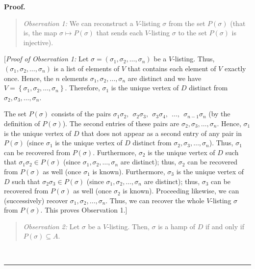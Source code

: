 \documentclass[numbers=enddot,12pt,final,onecolumn,notitlepage]{scrartcl}%
\numberwithin{exer}{subsection}
\theoremstyle{definition}
\newenvironment{statement}{\begin{quote}}{\end{quote}}
\newenvironment{proof}[1][Proof]{\noindent\textbf{#1.} }{\ \rule{0.5em}{0.5em}}
\begin{document}
\begin{proof}
\begin{statement}
\textit{Observation 1:} We can reconstruct a $V$-listing $\sigma$ from the set
$P\left(  \sigma\right)  $ (that is, the map $\sigma\mapsto P\left(
\sigma\right)  $ that sends each $V$-listing $\sigma$ to the set $P\left(
\sigma\right)  $ is injective).
\end{statement}

[\textit{Proof of Observation 1:} Let $\sigma=\left(  \sigma_{1},\sigma
_{2},\ldots,\sigma_{n}\right)  $ be a $V$-listing. Thus, $\left(  \sigma
_{1},\sigma_{2},\ldots,\sigma_{n}\right)  $ is a list of elements of $V$ that
contains each element of $V$ exactly once. Hence, the $n$ elements $\sigma
_{1},\sigma_{2},\ldots,\sigma_{n}$ are distinct and we have $V=\left\{
\sigma_{1},\sigma_{2},\ldots,\sigma_{n}\right\}  $. Therefore, $\sigma_{1}$ is
the unique vertex of $D$ distinct from $\sigma_{2},\sigma_{3},\ldots
,\sigma_{n}$.

The set $P\left(  \sigma\right)  $ consists of the pairs $\sigma_{1}\sigma
_{2},\ \ \sigma_{2}\sigma_{3},\ \ \sigma_{3}\sigma_{4},\ \ \ldots
,\ \ \sigma_{n-1}\sigma_{n}$ (by the definition of $P\left(  \sigma\right)
$). The second entries of these pairs are $\sigma_{2},\sigma_{3},\ldots
,\sigma_{n}$. Hence, $\sigma_{1}$ is the unique vertex of $D$ that does not
appear as a second entry of any pair in $P\left(  \sigma\right)  $ (since
$\sigma_{1}$ is the unique vertex of $D$ distinct from $\sigma_{2},\sigma
_{3},\ldots,\sigma_{n}$). Thus, $\sigma_{1}$ can be recovered from $P\left(
\sigma\right)  $. Furthermore, $\sigma_{2}$ is the unique vertex of $D$ such
that $\sigma_{1}\sigma_{2}\in P\left(  \sigma\right)  $ (since $\sigma
_{1},\sigma_{2},\ldots,\sigma_{n}$ are distinct); thus, $\sigma_{2}$ can be
recovered from $P\left(  \sigma\right)  $ as well (once $\sigma_{1}$ is
known). Furthermore, $\sigma_{3}$ is the unique vertex of $D$ such that
$\sigma_{2}\sigma_{3}\in P\left(  \sigma\right)  $ (since $\sigma_{1}%
,\sigma_{2},\ldots,\sigma_{n}$ are distinct); thus, $\sigma_{3}$ can be
recovered from $P\left(  \sigma\right)  $ as well (once $\sigma_{2}$ is
known). Proceeding likewise, we can (successively) recover $\sigma_{1}%
,\sigma_{2},\ldots,\sigma_{n}$. Thus, we can recover the whole $V$-listing
$\sigma$ from $P\left(  \sigma\right)  $. This proves Observation 1.]

\begin{statement}
\textit{Observation 2:} Let $\sigma$ be a $V$-listing. Then, $\sigma$ is a
hamp of $D$ if and only if $P\left(  \sigma\right)  \subseteq A$.
\end{statement}


\end{proof}
\end{document}
